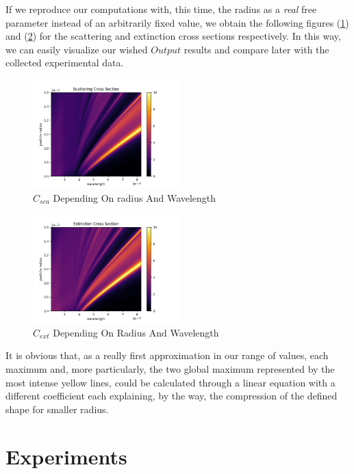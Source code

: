 \documentclass{article}
\numberwithin{equation}{section}
\begin{document}
If we reproduce our computations with, this time, the radius as a \textit{real} free parameter instead of an arbitrarily fixed value, we obtain the following figures (\ref{fig:surface_sca}) and (\ref{fig:surface_ext}) for the scattering and extinction cross sections respectively. In this way, we can easily visualize our wished $Output$ results and compare later with the collected experimental data.
\begin{figure}[h!]
    \centering
    \includegraphics[width=0.5\textwidth, height=0.4\textwidth]{surface_sca.png}
    \caption{$C_{sca}$ Depending On radius And Wavelength}
    \label{fig:surface_sca}
\end{figure}
\begin{figure}[h!]
    \centering
    \includegraphics[width=0.5\textwidth, height=0.4\textwidth]{surface_ext.png}
    \caption{$C_{ext}$ Depending On Radius And Wavelength}
    \label{fig:surface_ext}
\end{figure}
It is obvious that, as a really first approximation in our range of values, each maximum and, more particularly, the two global maximum represented by the most intense yellow lines, could be calculated through a linear equation with a different coefficient each explaining, by the way, the compression of the defined shape for smaller radius.

\section{Experiments}
\end{document}
